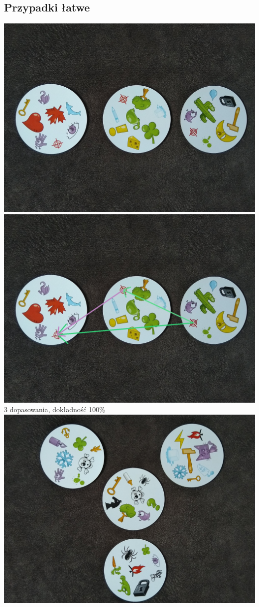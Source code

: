 \documentclass[10pt,a4paper]{article}
\begin{document}
\subsection{Przypadki łatwe}
\begin{center}
\includegraphics[scale=0.28]{easy/dobble01.jpg}
\includegraphics[scale=0.28]{easy/img_arrows0.jpg}\\
3 dopasowania, dokładność 100\%
\includegraphics[scale=0.28]{easy/dobble02.jpg}

\end{center}
\end{document}
